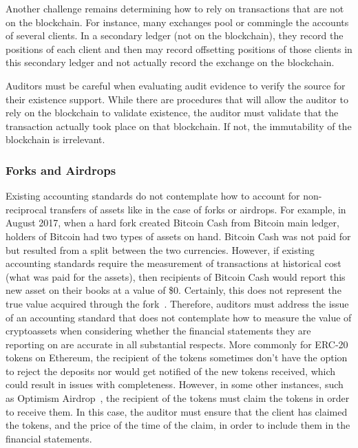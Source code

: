 Another challenge remains determining how to rely on transactions that are not on the blockchain. For instance, many exchanges pool or commingle the accounts of several clients. In a secondary ledger (not on the blockchain), they record the positions of each client and then may record offsetting positions of those clients in this secondary ledger and not actually record the exchange on the blockchain.

Auditors must be careful when evaluating audit evidence to verify the source for their existence support. While there are procedures that will allow the auditor to rely on the blockchain to validate existence, the auditor must validate that the transaction actually took place on that blockchain. If not, the immutability of the blockchain is irrelevant.


\subsubsection{Forks and Airdrops} \label{sec:auditing:framework:existence:airdrops}
Existing accounting standards do not contemplate how to account for non-reciprocal transfers of assets like in the case of forks or airdrops. For example, in August 2017, when a hard fork created Bitcoin Cash from Bitcoin main ledger, holders of Bitcoin had two types of assets on hand. Bitcoin Cash was not paid for but resulted from a split between the two currencies. However, if existing accounting standards require the measurement of transactions at historical cost (what was paid for the assets), then recipients of Bitcoin Cash would report this new asset on their books at a value of \$0. Certainly, this does not represent the true value acquired through the fork~\cite{webb2018fork}. Therefore, auditors must address the issue of an accounting standard that does not contemplate how to measure the value of cryptoassets when considering whether the financial statements they are reporting on are accurate in all substantial respects. More commonly for ERC-20 tokens on Ethereum, the recipient of the tokens sometimes don't have the option to reject the deposits nor would get notified of the new tokens received, which could result in issues with completeness. However, in some other instances, such as Optimism Airdrop~\cite{allen2023airdrop}, the recipient of the tokens must claim the tokens in order to receive them. In this case, the auditor must ensure that the client has claimed the tokens, and the price of the time of the claim, in order to include them in the financial statements.


